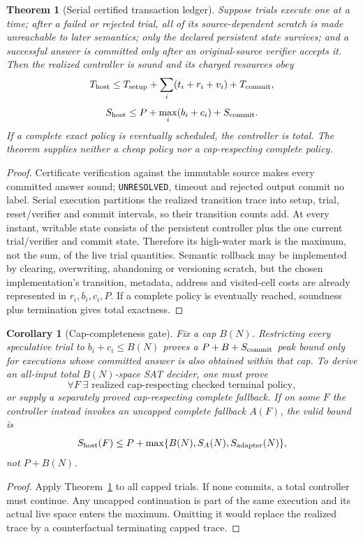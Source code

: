 \documentclass[11pt]{article}
\newtheorem{theorem}{Theorem}
\newtheorem{corollary}{Corollary}
\begin{document}
\begin{theorem}[Serial certified transaction ledger]\label{thm:ledger}
Suppose trials execute one at a time; after a failed or rejected trial, all of
its source-dependent scratch is made unreachable to later semantics; only the
declared persistent state survives; and a successful answer is committed only
after an original-source verifier accepts it.  Then the realized controller is
sound and its charged resources obey
\[
 T_{\rm host}\le T_{\rm setup}+\sum_i(t_i+r_i+v_i)+T_{\rm commit},
\]
\[
 S_{\rm host}\le P+\max_i(b_i+c_i)+S_{\rm commit}.
\]
If a complete exact policy is eventually scheduled, the controller is total.
The theorem supplies neither a cheap policy nor a cap-respecting complete
policy.
\end{theorem}
\begin{proof}
Certificate verification against the immutable source makes every committed
answer sound; \texttt{UNRESOLVED}, timeout and rejected output commit no label.
Serial execution partitions the realized transition trace into setup, trial,
reset/verifier and commit intervals, so their transition counts add.  At every
instant, writable state consists of the persistent controller plus the one
current trial/verifier and commit state.  Therefore its high-water mark is the
maximum, not the sum, of the live trial quantities.  Semantic rollback may be
implemented by clearing, overwriting, abandoning or versioning scratch, but
the chosen implementation's transition, metadata, address and visited-cell
costs are already represented in $r_i,b_i,c_i,P$.  If a complete policy is
eventually reached, soundness plus termination gives total exactness.
\end{proof}

\begin{corollary}[Cap-completeness gate]\label{cor:cap}
Fix a cap $B(N)$.  Restricting every speculative trial to $b_i+c_i\le B(N)$
proves a $P+B+S_{\rm commit}$ peak bound only for executions whose committed
answer is also obtained within that cap.  To derive an all-input total
$B(N)$-space SAT decider, one must prove
\[
 \forall F\;\exists\text{ realized cap-respecting checked terminal policy},
\]
or supply a separately proved cap-respecting complete fallback.  If on some
$F$ the controller instead invokes an uncapped complete fallback $A(F)$, the
valid bound is
\[
 S_{\rm host}(F)\le P+\max\{B(N),S_A(N),S_{\rm adapter}(N)\},
\]
not $P+B(N)$.
\end{corollary}
\begin{proof}
Apply Theorem~\ref{thm:ledger} to all capped trials.  If none commits, a total
controller must continue.  Any uncapped continuation is part of the same
execution and its actual live space enters the maximum.  Omitting it would
replace the realized trace by a counterfactual terminating capped trace.
\end{proof}
\end{document}
